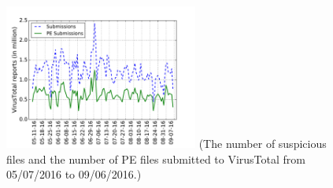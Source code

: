 

\begin{figure}[t!]
\begin{center}
\includegraphics[width=2.5in]{figure/Submissions}
{\footnotesize{(The number of suspicious files and the number of PE files submitted to VirusTotal from 05/07/2016 to 09/06/2016.)
}}
\end{center}
\end{figure}
